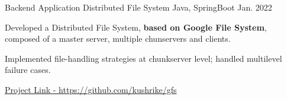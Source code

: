 \vspace{-2mm}


\vspace{-1mm}
\begin{cventries}


\cventry
    {Backend Application} %
    {Distributed File System} %
    {Java, SpringBoot} %
    {Jan. 2022} %
    {
      \begin{cvitems} %
        \item {Developed a Distributed File System, \textbf{based on Google File System}, composed of a master server, multiple chunservers and clients.}
        \item {Implemented file-handling strategies at chunkserver level; handled multilevel failure cases.}
        \item {\href{https://github.com/kushrike/gfs}{Project Link - https://github.com/kushrike/gfs}}
      \end{cvitems}
    }


  


\end{cventries}
